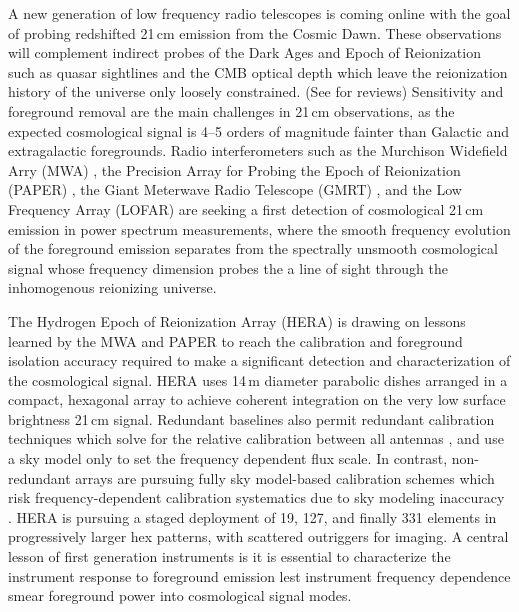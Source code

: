 \documentclass{emulateapj}
\begin{document}
A new generation of low frequency radio telescopes is coming online with the goal of
 probing redshifted 21\,cm emission from the Cosmic Dawn. These observations will 
 complement indirect probes of the Dark Ages and Epoch of Reionization such as quasar 
 sightlines and the CMB optical depth which leave the reionization 
 history of the universe only loosely constrained. (See \citet{FurlanettoReview, miguelreview, PritchardLoebReview, aviBook, zaroubi} for reviews) Sensitivity and foreground removal are 
 the main challenges in 21\,cm observations, as the expected cosmological signal is 4--5 
 orders of magnitude fainter than Galactic and extragalactic foregrounds. Radio 
 interferometers such as the Murchison Widefield Arry (MWA) \citep{tingay13,mwascience}, the Precision Array for Probing the Epoch of Reionization (PAPER) \citep{ali2015}, the Giant Meterwave Radio Telescope (GMRT) 
 \citep{Paciga2011}, and the Low Frequency Array (LOFAR) \citep{lofar} are seeking a first detection of 
 cosmological 21\,cm emission in power spectrum measurements, where the smooth 
 frequency evolution of the foreground emission separates from the spectrally 
 unsmooth cosmological signal whose frequency dimension probes the a line of sight through the 
 inhomogenous reionizing universe.


The Hydrogen Epoch of Reionization Array (HERA) \citep[][, deBoer et al., submitted]{PoberNextGen} is drawing on lessons learned by the MWA and PAPER to reach the calibration and foreground isolation accuracy required to make a significant detection and characterization of the cosmological signal. HERA uses 14\,m diameter parabolic dishes arranged in a compact, hexagonal array to achieve coherent integration on the very low surface brightness 21\,cm signal. Redundant baselines also permit redundant calibration techniques which solve for the relative calibration between all antennas \citep{zheng14}, and use a sky model only to set the frequency dependent flux scale. In contrast, non-redundant arrays are pursuing fully sky model-based calibration schemes which risk frequency-dependent calibration systematics due to sky modeling inaccuracy \citep{braun2013}. HERA is pursuing a staged deployment of 19, 127, and finally 331 elements in progressively larger hex patterns, with scattered outriggers for imaging. A central lesson of first generation instruments is it is essential to characterize the instrument response to foreground emission lest instrument frequency dependence smear foreground power into cosmological signal modes. 
\end{document}
